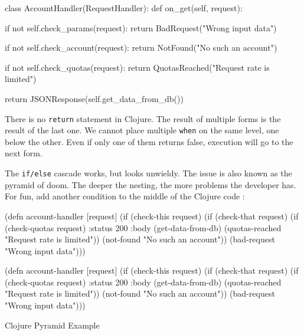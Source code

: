\else

\begin{english}
  \begin{python}
class AccountHandler(RequestHandler):
  def on_get(self, request):

    if not self.check_params(request):
      return BadRequest("Wrong input data")

    if not self.check_account(request):
      return NotFound("No such an account")

    if not self.check_quotas(request):
      return QuotasReached("Request rate is limited")

    return JSONResponse(self.get_data_from_db())
  \end{python}
\end{english}

\fi

There is no \verb|return| statement in Clojure. The result of multiple forms is the result of the last one. We cannot place multiple \verb|when| on the same level, one below the other. Even if only one of them returns false, execution will go to the next form.


The \verb|if/else| cascade works, but looks unwieldy. The issue is also known as the pyramid of doom. The deeper the nesting, the more problems the developer has. For fun, add another condition to the middle of the Clojure code :

\begin{listing}[ht!]

\ifnarrow

\begin{clojure}
(defn account-handler [request]
  (if (check-this request)
    (if (check-that request)
      (if (check-quotas request)
        {:status 200
         :body (get-data-from-db)}
        (quotas-reached
          "Request rate is limited"))
      (not-found "No such an account"))
    (bad-request "Wrong input data")))
\end{clojure}

\else

\begin{clojure}
(defn account-handler [request]
  (if (check-this request)
    (if (check-that request)
      (if (check-quotas request)
        {:status 200
         :body (get-data-from-db)}
        (quotas-reached "Request rate is limited"))
      (not-found "No such an account"))
    (bad-request "Wrong input data")))
\end{clojure}

\fi

\caption{Clojure Pyramid Example}
\label{fig:clj-pyramid}

\end{listing}

